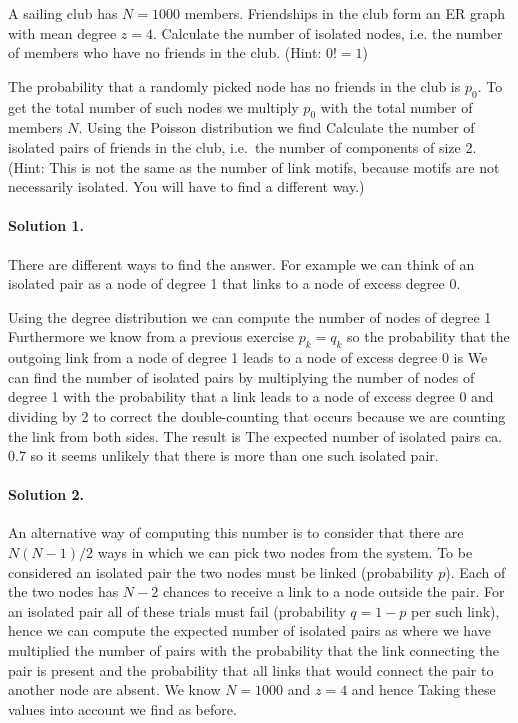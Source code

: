A sailing club has $N=1000$ members. Friendships in the club form an ER graph with mean degree $z=4$. 
\subquestion 
Calculate the number of isolated nodes, i.e. the number of members who have no friends in the club. (Hint: $0!=1$)

\solution
The probability that a randomly picked node has no friends in the club is $p_0$. To get the total number of such nodes we multiply $p_0$ with the total number of members $N$.  Using the Poisson distribution we find
\subquestion 
Calculate the number of isolated pairs of friends in the club, i.e.~the number of components of size 2. (Hint: This is not the same as the number of link motifs, because motifs are not necessarily isolated. You will have to find a different way.) 

\solution
\paragraph{Solution 1.}There are different ways to find the answer. For example we can think of an isolated pair as a node of degree 1 that links to a node of excess degree 0.

Using the degree distribution we can compute the number of nodes of degree 1
Furthermore we know from a previous exercise $p_k=q_k$ so the probability that the outgoing link from a node of degree 1 leads to a node of excess degree 0 is 
We can find the number of isolated pairs by multiplying the number of nodes of degree 1 with the probability that a link leads to a node of excess degree 0 and dividing by 2 to correct the double-counting that occurs because we are counting the link from both sides. The result is 
The expected number of isolated pairs ca. 0.7 so it seems unlikely that there is more than one such isolated pair. 

\paragraph{Solution 2.}An alternative way of computing this number is to consider that there are $N(N-1)/2$ ways in which we can pick two nodes from the system. To be considered an isolated pair the two nodes must be linked (probability $p$). Each of the two nodes has $N-2$ chances to receive a link to a node outside the pair. For an isolated pair all of these trials must fail (probability $q=1-p$ per such link), hence we can compute the expected number of isolated pairs as
where we have multiplied the number of pairs with the probability that the link connecting the pair is present and the probability that all links that would connect the pair to another node are absent. 
We know $N=1000$ and $z=4$ and hence 
Taking these values into account we find 
as before.

